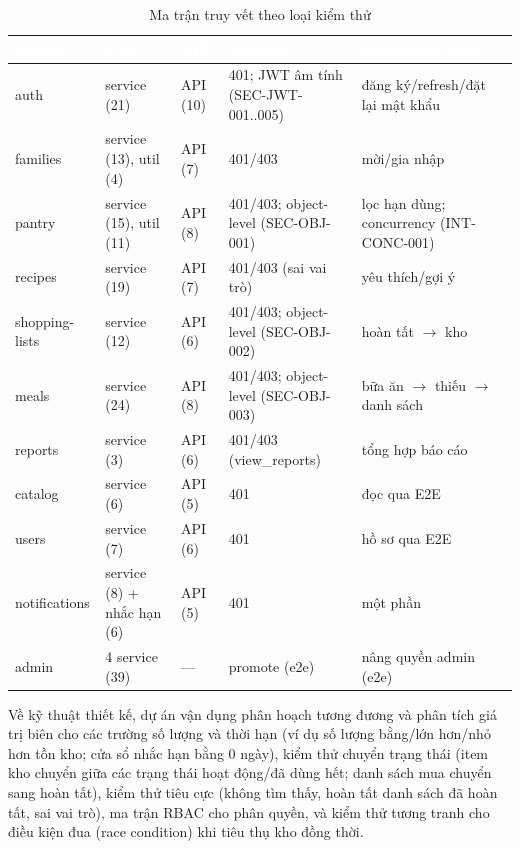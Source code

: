 \documentclass[12pt,a4paper]{article}
\newcommand{\thead}[1]{\textbf{\textcolor{white}{#1}}}
\begin{document}
\begin{table}[h]
\centering
\small
\setlength{\tabcolsep}{5pt}
\caption{Ma trận truy vết theo loại kiểm thử}
\label{tab:matrix}
\begin{tabularx}{\linewidth}{|l|Y|Y|Y|Y|}
\hline
{}
\thead{Module} & \thead{Unit} & \thead{API} & \thead{Security} & \thead{Integration/E2E} \\
\hline
auth & service (21) & API (10) & 401; JWT âm tính (SEC-JWT-001..005) & đăng ký/refresh/đặt lại mật khẩu \\
\hline
families & service (13), util (4) & API (7) & 401/403 & mời/gia nhập \\
\hline
pantry & service (15), util (11) & API (8) & 401/403; object-level (SEC-OBJ-001) & lọc hạn dùng; concurrency (INT-CONC-001) \\
\hline
recipes & service (19) & API (7) & 401/403 (sai vai trò) & yêu thích/gợi ý \\
\hline
shopping-lists & service (12) & API (6) & 401/403; object-level (SEC-OBJ-002) & hoàn tất $\to$ kho \\
\hline
meals & service (24) & API (8) & 401/403; object-level (SEC-OBJ-003) & bữa ăn $\to$ thiếu $\to$ danh sách \\
\hline
reports & service (3) & API (6) & 401/403 (view\_reports) & tổng hợp báo cáo \\
\hline
catalog & service (6) & API (5) & 401 & đọc qua E2E \\
\hline
users & service (7) & API (6) & 401 & hồ sơ qua E2E \\
\hline
notifications & service (8) + nhắc hạn (6) & API (5) & 401 & một phần \\
\hline
admin & 4 service (39) & --- & promote (e2e) & nâng quyền admin (e2e) \\
\hline
\end{tabularx}
\end{table}

Về kỹ thuật thiết kế, dự án vận dụng phân hoạch tương đương và phân tích giá trị biên cho các trường số
lượng và thời hạn (ví dụ số lượng bằng/lớn hơn/nhỏ hơn tồn kho; cửa sổ nhắc hạn bằng 0 ngày), kiểm thử
chuyển trạng thái (item kho chuyển giữa các trạng thái hoạt động/đã dùng hết; danh sách mua chuyển sang hoàn
tất), kiểm thử tiêu cực (không tìm thấy, hoàn tất danh sách đã hoàn tất, sai vai trò), ma trận RBAC cho phân
quyền, và kiểm thử tương tranh cho điều kiện đua (race condition) khi tiêu thụ kho đồng thời.

\end{document}
